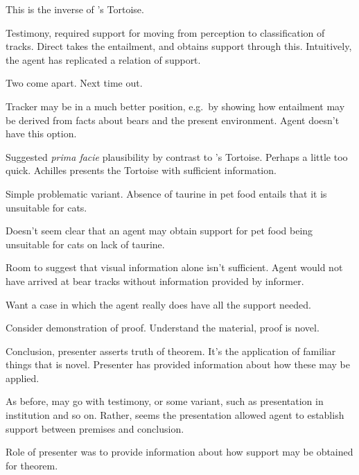 \begin{note}
  This is the inverse of \citeauthor{Carroll:1895uj}'s Tortoise.

  Testimony, required support for moving from perception to classification of tracks.
  Direct takes the entailment, and obtains support through this.
  Intuitively, the agent has replicated a relation of support.

  Two come apart.
  Next time out.

  Tracker may be in a much better position, e.g.\ by showing how entailment may be derived from facts about bears and the present environment.
  Agent doesn't have this option.
\end{note}

\begin{note}
  Suggested \emph{prima facie} plausibility by contrast to \citeauthor{Carroll:1895uj}'s Tortoise.
  Perhaps a little too quick.
  Achilles presents the Tortoise with sufficient information.
  
\end{note}

\begin{note}
  Simple problematic variant.
  Absence of taurine in pet food entails that it is unsuitable for cats.

  Doesn't seem clear that an agent may obtain support for pet food being unsuitable for cats on lack of taurine.
  
\end{note}

\begin{note}
  Room to suggest that visual information alone isn't sufficient.
  Agent would not have arrived at bear tracks without information provided by informer.
\end{note}



\begin{note}[Hum]
  Want a case in which the agent really does have all the support needed.

  Consider demonstration of proof.
  Understand the material, proof is novel.

  Conclusion, presenter asserts truth of theorem.
  It's the application of familiar things that is novel.
  Presenter has provided information about how these may be applied.

  As before, may go with testimony, or some variant, such as presentation in institution and so on.
  Rather, seems the presentation allowed agent to establish support between premises and conclusion.

  Role of presenter was to provide information about how support may be obtained for theorem.
\end{note}

